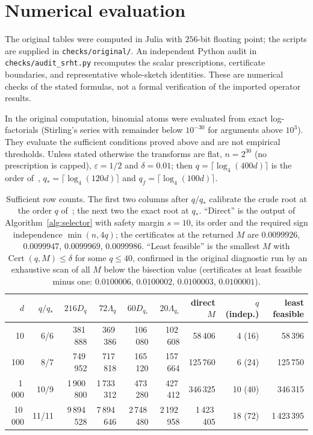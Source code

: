 \documentclass[11pt,a4paper]{article}
\theoremstyle{definition}
\theoremstyle{remark}
\numberwithin{equation}{section}
\newcommand{\eps}{\varepsilon}
\newcommand{\Cert}{\operatorname{Cert}}
\begin{document}
\section{Numerical evaluation}\label{sec:numerics}

The original tables were computed in Julia with $256$-bit
floating point; the scripts are supplied in \texttt{checks/original/}.
An independent Python audit in \texttt{checks/audit\_srht.py} recomputes
the scalar prescriptions, certificate boundaries, and representative
whole-sketch identities. These are numerical checks of the stated formulas,
not a formal verification of the imported operator results.

In the original computation, binomial atoms were evaluated from exact log-factorials
(Stirling's series with remainder below $10^{-30}$ for arguments above
$10^3$). They evaluate the sufficient conditions proved above and are not
empirical thresholds. Unless stated otherwise the transforms are flat,
$n=2^{30}$ (no prescription is capped), $\eps=1/2$ and $\delta=0.01$; then
$q=\lceil\log_4(400d)\rceil$ is the order of~\cite{V11,HY},
$q_*=\lceil\log_4(120d)\rceil$ and $q_f=\lceil\log_4(100d)\rceil$.

\begin{table}[ht]
\centering\small
\setlength{\tabcolsep}{4.5pt}
\begin{tabular}{rrrrrrrrr}
\toprule
$d$ & $q/q_*$ & $216D_q$ & $72\Lambda_q$ & $60D_{q_*}$ & $20\Lambda_{q_*}$ &
direct $M$ & $q$ (indep.) & least feasible\\
\midrule
10 & 6/6 & 381\,888 & 369\,386 & 106\,080 & 102\,608 & 58\,406 & 4 (16) & 58\,396\\
100 & 8/7 & 749\,952 & 717\,818 & 165\,120 & 157\,664 & 125\,760 & 6 (24) & 125\,750\\
1\,000 & 10/9 & 1\,900\,800 & 1\,733\,312 & 473\,280 & 427\,412 & 346\,325 & 10 (40) & 346\,315\\
10\,000 & 11/11 & 9\,894\,528 & 7\,894\,646 & 2\,748\,480 & 2\,192\,958 & 1\,423\,405 & 18 (72) & 1\,423\,395\\
\bottomrule
\end{tabular}
\caption{Sufficient row counts. The first two columns after $q/q_*$ calibrate the
crude root at the order $q$ of~\cite{V11,HY}; the next two the exact root at
$q_*$. ``Direct'' is the output of Algorithm~\ref{alg:selector} with safety
margin $s=10$, its order and the required sign independence $\min(n,4q)$; the
certificates at the returned $M$ are $0.0099926$, $0.0099947$, $0.0099969$,
$0.0099986$. ``Least feasible'' is the smallest $M$ with $\Cert(q,M)\le\delta$
for some $q\le40$, confirmed in the original diagnostic run by an exhaustive scan of all $M$ below the
bisection value (certificates at least feasible minus one: $0.0100006$,
$0.0100002$, $0.0100003$, $0.0100001$).}
\label{tab:prescriptions}
\end{table}
\end{document}
